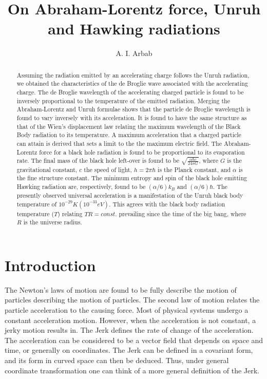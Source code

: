 \documentclass[12pt]{article}
\title{On Abraham-Lorentz force, Unruh and Hawking radiations}
\author{A. I. Arbab}
\begin{document}
\maketitle

\begin{abstract}
Assuming the radiation emitted by an accelerating charge follows the Unruh radiation, we obtained the  characteristics of the de Broglie wave associated with the accelerating charge.  The de Broglie wavelength of the accelerating charged particle is found to be inversely proportional to the temperature of the emitted radiation.  Merging the Abraham-Lorentz and Unruh formulae shows that the particle de Broglie wavelength is found to vary inversely with its acceleration. It is found to have the same structure as that of the Wien's displacement law relating the maximum wavelength of the Black Body radiation to its temperature. A maximum acceleration that a charged particle can attain is derived that sets a limit to the the maximum electric field. The Abraham-Lorentz force for a black hole radiation is found to be proportional to its evaporation rate. The final mass of the black hole left-over is found to be $\sqrt{\frac{\alpha\hbar c}{24 \pi G} }$, where $G$ is the gravitational constant, $c$ the speed of light, $h=2\pi\hbar$ is the Planck constant, and $\alpha$ is the fine structure constant. The minimum entropy and spin of the black hole emitting Hawking radiation are, respectively, found to be $(\alpha/6) k_B$ and $(\alpha/6)\hbar$. The presently observed universal acceleration is a manifestation of the  Unruh black body temperature of $10^{-29}K (10^{-33}eV)$. This agrees with the black body radiation temperature ($T$) relating $TR=const.$ prevailing since the time of the big bang, where $R$ is the universe radius.
\end{abstract}

\newpage

\section{Introduction}

The Newton's laws of motion are found to be fully describe the motion of particles describing the motion of  particles. The second law of motion relates the particle acceleration to the causing force. Most of physical systems undergo a constant acceleration motion. However, when the acceleration is not constant, a jerky motion results in. The Jerk defines the rate of change of the acceleration. The acceleration can  be considered to be a vector field that depends on space and time, or generally on coordinates. The Jerk can be defined in a covariant form, and  its form in curved space can then be deduced. Thus, under general coordinate transformation one can think of a more general definition of the Jerk.
\end{document}
